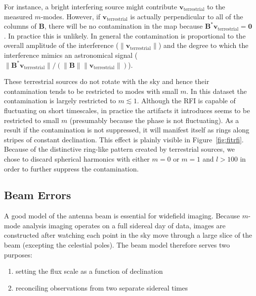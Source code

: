 \documentclass[twocolumn]{aastex61}
\renewcommand{\b}{\pmb}
\begin{document}
For instance, a bright interfering source might contribute $\b v_\text{terrestrial}$ to the measured
$m$-modes. However, if $\b v_\text{terrestrial}$ is actually perpendicular to all of the columns of
$\b B$, there will be no contamination in the map because $\b B^*\b v_\text{terrestrial} = \b 0$.
In practice this is unlikely. In general the contamination is proportional to the overall amplitude
of the interference ($\|\b v_\text{terrestrial}\|$) and the degree to which the interference mimics
an astronomical signal ($\|\b B^*\b v_\text{terrestrial}\|/(\|\b B\|\|\b v_\text{terrestrial}\|)$).

These terrestrial sources do not rotate with the sky and hence their contamination tends to be
restricted to modes with small $m$. In this dataset the contamination is largely restricted to $m
\lesssim 1$. Although the RFI is capable of fluctuating on short timescales, in practice the
artifacts it introduces seems to be restricted to small $m$ (presumably because the phase is not
fluctuating).  As a result if the contamination is not suppressed, it will manifest itself as rings
along stripes of constant declination. This effect is plainly visible in Figure~\ref{fig:fitrfi}.
Because of the distinctive ring-like pattern created by terrestrial sources, we chose to discard
spherical harmonics with either $m=0$ or $m=1$ and $l>100$ in order to further suppress the
contamination.

\subsection{Beam Errors}

A good model of the antenna beam is essential for widefield imaging. Because $m$-mode analysis
imaging operates on a full sidereal day of data, images are constructed after watching each point in
the sky move through a large slice of the beam (excepting the celestial poles). The beam model
therefore serves two purposes:

\begin{enumerate}
    \item setting the flux scale as a function of declination
    \item reconciling observations from two separate sidereal times
\end{enumerate}
\end{document}
